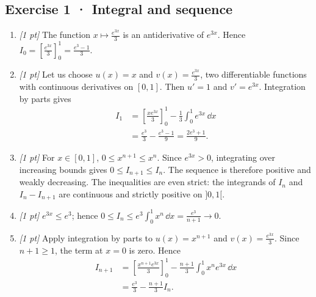 \subsection*{Exercise 1 · Integral and sequence}\begin{enumerate}

\item \textit{[1 pt]} The function $x\mapsto \frac{e^{3x}}{3}$ is an antiderivative of $e^{3x}$. Hence $I_0=[\frac{e^{3x}}{3}]_0^1=\frac{e^{3}-1}{3}$.

\item \textit{[1 pt]} Let us choose $u(x)=x$ and $v(x)=\frac{e^{3x}}{3}$, two differentiable functions with continuous derivatives on $[0,1]$. Then $u'=1$ and $v'=e^{3x}$. Integration by parts gives
\[\begin{aligned}I_1&=\left[\frac{xe^{3x}}{3}\right]_0^1-\frac{1}{3}\int_0^1e^{3x}\,\dd x\\&=\frac{e^{3}}{3}-\frac{e^{3}-1}{9}=\frac{2e^{3}+1}{9}.\end{aligned}\]

\item \textit{[1 pt]} For $x\in[0,1]$, $0\le x^{n+1}\le x^n$. Since $e^{3x}>0$, integrating over increasing bounds gives $0\le I_{n+1}\le I_n$. The sequence is therefore positive and weakly decreasing. The inequalities are even strict: the integrands of $I_n$ and $I_n-I_{n+1}$ are continuous and strictly positive on $]0,1[$.

\item \textit{[1 pt]} $e^{3x}\le e^{3}$; hence $0\le I_n\le e^{3}\int_0^1x^n\,\dd x=\frac{e^{3}}{n+1}\to0$.

\item \textit{[1 pt]} Apply integration by parts to $u(x)=x^{n+1}$ and $v(x)=\frac{e^{3x}}{3}$. Since $n+1\ge1$, the term at $x=0$ is zero. Hence
\[\begin{aligned}I_{n+1}&=\left[\frac{x^{n+1}e^{3x}}{3}\right]_0^1-\frac{n+1}{3}\int_0^1x^ne^{3x}\,\dd x\\&=\frac{e^{3}}{3}-\frac{n+1}{3}I_n.\end{aligned}\]

\end{enumerate}

